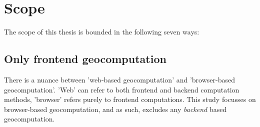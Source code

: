 

\newpage
\section{Scope}
The scope of this thesis is bounded in the following seven ways: 

\subsection*{Only frontend geocomputation}



There is a nuance between 'web-based geocomputation' and 'browser-based geocomputation'. 
'Web' can refer to both frontend and backend computation methods, 'browser' refers purely to frontend computations. 
This study focusses on browser-based geocomputation, and as such, excludes any \emph {backend} based geocomputation.

